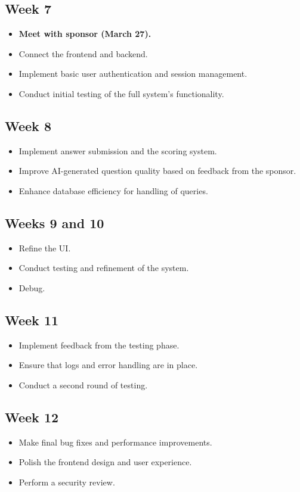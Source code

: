 \documentclass{scrartcl}
\begin{document}
\subsection{Week 7}
\begin{itemize}
\item \textbf{Meet with sponsor (March 27).}
\item Connect the frontend and backend.
\item Implement basic user authentication and session management.
\item Conduct initial testing of the full system's functionality.
\end{itemize}

\subsection{Week 8}
\begin{itemize}
\item Implement answer submission and the scoring system.
\item Improve AI-generated question quality based on feedback from the sponsor.
\item Enhance database efficiency for handling of queries.
\end{itemize}

\subsection{Weeks 9 and 10}
\begin{itemize}
\item Refine the UI.
\item Conduct testing and refinement of the system.
\item Debug.
\end{itemize}

\subsection{Week 11}
\begin{itemize}
\item Implement feedback from the testing phase.
\item Ensure that logs and error handling are in place.
\item Conduct a second round of testing.
\end{itemize}

\subsection{Week 12}
\begin{itemize}
\item Make final bug fixes and performance improvements.
\item Polish the frontend design and user experience.
\item Perform a security review.
\end{itemize}
\end{document}
